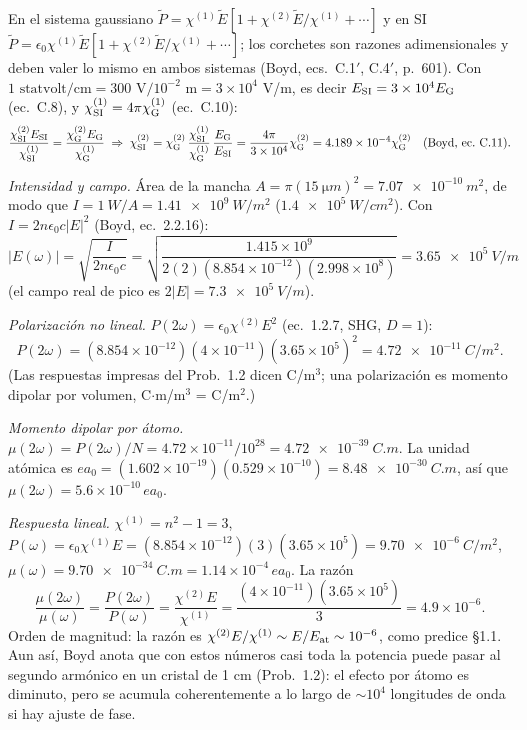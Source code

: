  En el sistema gaussiano $\tilde P=\chi^{(1)}\tilde E[1+\chi^{(2)}\tilde E/\chi^{(1)}+\cdots]$ y en SI $\tilde P=\epsilon_0\chi^{(1)}\tilde E[1+\chi^{(2)}\tilde E/\chi^{(1)}+\cdots]$; los corchetes son razones adimensionales y deben valer lo mismo en ambos sistemas (Boyd, ecs.~C.1$'$, C.4$'$, p.~601). Con $1\text{ statvolt/cm}=300\text{ V}/10^{-2}\text{ m}=3\times10^4$ V/m, es decir $E_{\rm SI}=3\times10^4E_{\rm G}$ (ec.~C.8), y $\chi^{(1)}_{\rm SI}=4\pi\chi^{(1)}_{\rm G}$ (ec.~C.10):
\[
\frac{\chi^{(2)}_{\rm SI}E_{\rm SI}}{\chi^{(1)}_{\rm SI}}=\frac{\chi^{(2)}_{\rm G}E_{\rm G}}{\chi^{(1)}_{\rm G}}
\;\Rightarrow\;
\chi^{(2)}_{\rm SI}=\chi^{(2)}_{\rm G}\,\frac{\chi^{(1)}_{\rm SI}}{\chi^{(1)}_{\rm G}}\,\frac{E_{\rm G}}{E_{\rm SI}}=\frac{4\pi}{3\times10^4}\chi^{(2)}_{\rm G}=4.189\times10^{-4}\chi^{(2)}_{\rm G}\quad\text{(Boyd, ec.~C.11)}.
\]

 \emph{Intensidad y campo.} Área de la mancha $A=\pi(\SI{15}{\micro m})^2=\SI{7.07e-10}{m^2}$, de modo que $I=\SI{1}{W}/A=\SI{1.41e9}{W/m^2}$ ($\SI{1.4e5}{W/cm^2}$). Con $I=2n\epsilon_0c|E|^2$ (Boyd, ec.~2.2.16):
\[
|E(\omega)|=\sqrt{\frac{I}{2n\epsilon_0c}}=\sqrt{\frac{1.415\times10^{9}}{2(2)(8.854\times10^{-12})(2.998\times10^8)}}=\SI{3.65e5}{V/m}
\]
(el campo real de pico es $2|E|=\SI{7.3e5}{V/m}$).

\emph{Polarización no lineal.} $P(2\omega)=\epsilon_0\chi^{(2)}E^2$ (ec.~1.2.7, SHG, $D=1$):
\[
P(2\omega)=(8.854\times10^{-12})(4\times10^{-11})(3.65\times10^5)^2=\SI{4.72e-11}{C/m^2}.
\]
(Las respuestas impresas del Prob.~1.2 dicen C/m$^3$; una polarización es momento dipolar por volumen, C$\cdot$m/m$^3$ = C/m$^2$.)

\emph{Momento dipolar por átomo.} $\mu(2\omega)=P(2\omega)/N=4.72\times10^{-11}/10^{28}=\SI{4.72e-39}{C.m}$. La unidad atómica es $ea_0=(1.602\times10^{-19})(0.529\times10^{-10})=\SI{8.48e-30}{C.m}$, así que $\mu(2\omega)=5.6\times10^{-10}\,ea_0$.

\emph{Respuesta lineal.} $\chi^{(1)}=n^2-1=3$, $P(\omega)=\epsilon_0\chi^{(1)}E=(8.854\times10^{-12})(3)(3.65\times10^5)=\SI{9.70e-6}{C/m^2}$, $\mu(\omega)=\SI{9.70e-34}{C.m}=1.14\times10^{-4}\,ea_0$. La razón
\[
\frac{\mu(2\omega)}{\mu(\omega)}=\frac{P(2\omega)}{P(\omega)}=\frac{\chi^{(2)}E}{\chi^{(1)}}=\frac{(4\times10^{-11})(3.65\times10^5)}{3}=4.9\times10^{-6}.
\]
Orden de magnitud: la razón es $\chi^{(2)}E/\chi^{(1)}\sim E/E_{\rm at}\sim10^{-6}$, como predice §1.1. Aun así, Boyd anota que con estos números casi toda la potencia puede pasar al segundo armónico en un cristal de 1 cm (Prob.~1.2): el efecto por átomo es diminuto, pero se acumula coherentemente a lo largo de $\sim10^4$ longitudes de onda si hay ajuste de fase.

